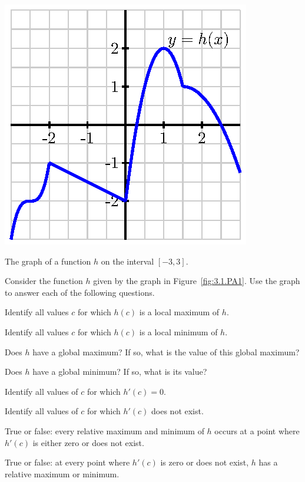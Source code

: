 \begin{marginfigure}[6cm]
\includegraphics{figures/3_1_PA1.eps}
\caption{The graph of a function $h$ on the interval $[-3,3]$.} \label{fig:3.1.PA1}
\end{marginfigure}

\begin{pa} \label{PA:3.1}
Consider the function $h$ given by the graph in Figure~\ref{fig:3.1.PA1}.  Use the graph to answer each of the following questions.

\ba
	\item Identify all values $c$ for which $h(c)$ is a local maximum of $h$.
	\item Identify all values $c$ for which $h(c)$ is a local minimum of $h$.
	\item Does $h$ have a global maximum?  If so, what is the value of this global maximum?
	\item Does $h$ have a global minimum?  If so, what is its value?
	\item Identify all values of $c$ for which $h'(c) = 0$.
	\item Identify all values of $c$ for which $h'(c)$ does not exist.
	\item True or false: every relative maximum and minimum of $h$ occurs at a point where $h'(c)$ is either zero or does not exist.
	\item True or false: at every point where $h'(c)$ is zero or does not exist, $h$ has a relative maximum or minimum.
\ea
\end{pa} \afterpa